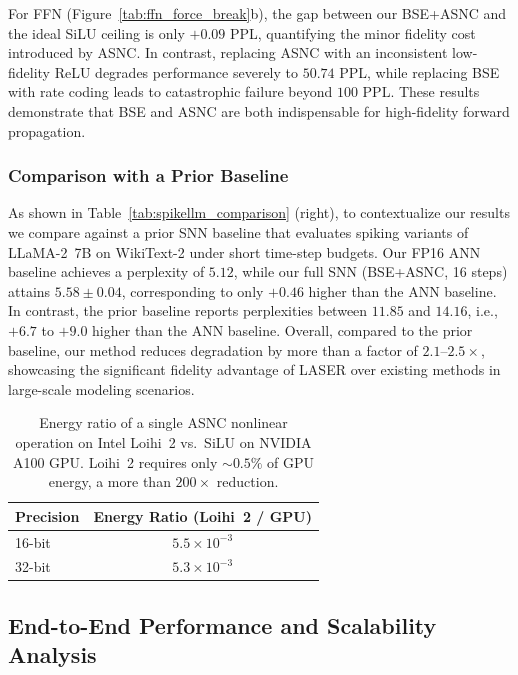 \documentclass{article}
\theoremstyle{plain}
\theoremstyle{definition}
\theoremstyle{remark}
\begin{document}
For FFN (Figure~\ref{tab:ffn_force_break}b), the gap between our BSE+ASNC and the ideal SiLU ceiling is only $+0.09$ PPL, quantifying the minor fidelity cost introduced by ASNC. In contrast, replacing ASNC with an inconsistent low-fidelity ReLU degrades performance severely to $50.74$ PPL, while replacing BSE with rate coding leads to catastrophic failure beyond $100$ PPL. These results demonstrate that BSE and ASNC are both indispensable for high-fidelity forward propagation.

\subsubsection{Comparison with a Prior Baseline}

As shown in Table~\ref{tab:spikellm_comparison} (right), to contextualize our results we compare against a prior SNN baseline that evaluates spiking variants of LLaMA-2~7B on WikiText-2 under short time-step budgets. Our FP16 ANN baseline achieves a perplexity of $5.12$, while our full SNN (BSE+ASNC, 16 steps) attains $5.58 \pm 0.04$, corresponding to only $+0.46$ higher than the ANN baseline. In contrast, the prior baseline reports perplexities between $11.85$ and $14.16$, i.e., $+6.7$ to $+9.0$ higher than the ANN baseline. Overall, compared to the prior baseline, our method reduces degradation by more than a factor of $2.1$--$2.5\times$, showcasing the significant fidelity advantage of LASER over existing methods in large-scale modeling scenarios.

\begin{table}[h!]
\centering
\caption{Energy ratio of a single ASNC nonlinear operation on Intel Loihi~2 vs.\ SiLU on NVIDIA A100 GPU. Loihi~2 requires only ${\sim}0.5\%$ of GPU energy, a more than $200\times$ reduction.}
\label{tab:hardware_efficiency}
\small
\begin{tabular}{lc}
\hline
\textbf{Precision} & \textbf{Energy Ratio (Loihi~2 / GPU)} \\
\hline
16-bit & $5.5 \times 10^{-3}$ \\
32-bit & $5.3 \times 10^{-3}$ \\
\hline
\end{tabular}
\end{table}

\subsection{End-to-End Performance and Scalability Analysis}
\label{subsec:performance_and_scalability}
\end{document}
